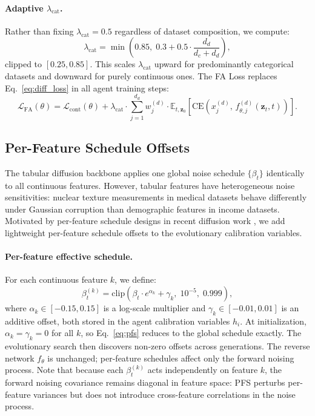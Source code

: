 \documentclass[preprint,12pt]{elsarticle}
\begin{document}
\paragraph{Adaptive $\lambda_{\text{cat}}$.}
Rather than fixing $\lambda_{\text{cat}} = 0.5$ regardless of dataset composition, we compute:
\begin{equation}
\lambda_{\text{cat}} = \min\!\left(0.85,\; 0.3 + 0.5 \cdot \frac{d_d}{d_c + d_d}\right),
\label{eq:auto_lambda}
\end{equation}
clipped to $[0.25, 0.85]$. This scales $\lambda_{\text{cat}}$ upward for predominantly categorical datasets and downward for purely continuous ones. The FA Loss replaces Eq.~\eqref{eq:diff_loss} in all agent training steps:
\begin{equation}
\mathcal{L}_{\text{FA}}(\theta) = \mathcal{L}_{\text{cont}}(\theta) + \lambda_{\text{cat}} \cdot \sum_{j=1}^{d_d} w_j^{(d)} \cdot \mathbb{E}_{t, \mathbf{z}_0}\!\left[\mathrm{CE}\!\left(x_j^{(d)},\, f_{\theta,j}^{(d)}(\mathbf{z}_t, t)\right)\right].
\label{eq:fa_loss}
\end{equation}

\subsection{Per-Feature Schedule Offsets}
\label{sec:method_pfs}

The tabular diffusion backbone applies one global noise schedule $\{\beta_t\}$ identically to all continuous features. However, tabular features have heterogeneous noise sensitivities: nuclear texture measurements in medical datasets behave differently under Gaussian corruption than demographic features in income datasets. Motivated by per-feature schedule designs in recent diffusion work \cite{VillaizanVallelado2025}, we add lightweight per-feature schedule offsets to the evolutionary calibration variables.

\paragraph{Per-feature effective schedule.}
For each continuous feature $k$, we define:
\begin{equation}
\beta_t^{(k)} = \mathrm{clip}\!\left(\beta_t \cdot e^{\alpha_k} + \gamma_k,\; 10^{-5},\; 0.999\right),
\label{eq:pfs}
\end{equation}
where $\alpha_k \in [-0.15, 0.15]$ is a log-scale multiplier and $\gamma_k \in [-0.01, 0.01]$ is an additive offset, both stored in the agent calibration variables $h_i$. At initialization, $\alpha_k = \gamma_k = 0$ for all $k$, so Eq.~\eqref{eq:pfs} reduces to the global schedule exactly. The evolutionary search then discovers non-zero offsets across generations. The reverse network $f_\theta$ is unchanged; per-feature schedules affect only the forward noising process. Note that because each $\beta_t^{(k)}$ acts independently on feature $k$, the forward noising covariance remains diagonal in feature space: PFS perturbs per-feature variances but does not introduce cross-feature correlations in the noise process.
\end{document}
